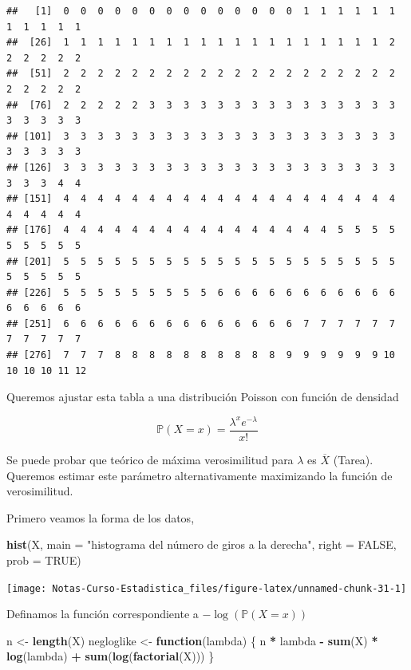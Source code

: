 \documentclass[
  12pt,
]{book}
\newenvironment{Shaded}{\begin{snugshade}}{\end{snugshade}}
\newcommand{\ControlFlowTok}[1]{\textcolor[rgb]{0.13,0.29,0.53}{\textbf{#1}}}
\newcommand{\DataTypeTok}[1]{\textcolor[rgb]{0.13,0.29,0.53}{#1}}
\newcommand{\KeywordTok}[1]{\textcolor[rgb]{0.13,0.29,0.53}{\textbf{#1}}}
\newcommand{\NormalTok}[1]{#1}
\newcommand{\OperatorTok}[1]{\textcolor[rgb]{0.81,0.36,0.00}{\textbf{#1}}}
\newcommand{\OtherTok}[1]{\textcolor[rgb]{0.56,0.35,0.01}{#1}}
\newcommand{\StringTok}[1]{\textcolor[rgb]{0.31,0.60,0.02}{#1}}
\begin{document}
\begin{verbatim}
##   [1]  0  0  0  0  0  0  0  0  0  0  0  0  0  0  1  1  1  1  1  1  1  1  1  1  1
##  [26]  1  1  1  1  1  1  1  1  1  1  1  1  1  1  1  1  1  1  1  2  2  2  2  2  2
##  [51]  2  2  2  2  2  2  2  2  2  2  2  2  2  2  2  2  2  2  2  2  2  2  2  2  2
##  [76]  2  2  2  2  2  3  3  3  3  3  3  3  3  3  3  3  3  3  3  3  3  3  3  3  3
## [101]  3  3  3  3  3  3  3  3  3  3  3  3  3  3  3  3  3  3  3  3  3  3  3  3  3
## [126]  3  3  3  3  3  3  3  3  3  3  3  3  3  3  3  3  3  3  3  3  3  3  3  4  4
## [151]  4  4  4  4  4  4  4  4  4  4  4  4  4  4  4  4  4  4  4  4  4  4  4  4  4
## [176]  4  4  4  4  4  4  4  4  4  4  4  4  4  4  4  4  5  5  5  5  5  5  5  5  5
## [201]  5  5  5  5  5  5  5  5  5  5  5  5  5  5  5  5  5  5  5  5  5  5  5  5  5
## [226]  5  5  5  5  5  5  5  5  5  6  6  6  6  6  6  6  6  6  6  6  6  6  6  6  6
## [251]  6  6  6  6  6  6  6  6  6  6  6  6  6  6  7  7  7  7  7  7  7  7  7  7  7
## [276]  7  7  7  8  8  8  8  8  8  8  8  8  8  9  9  9  9  9  9 10 10 10 10 11 12
\end{verbatim}

Queremos ajustar esta tabla a una distribución Poisson con función de densidad

\[
\mathbb{P}(X=x) = \frac{\lambda^x e^{-\lambda}}{x!} 
\]

Se puede probar que teórico de máxima verosimilitud para \(\lambda\) es \(\overline{X}\) (Tarea). Queremos estimar este parámetro alternativamente maximizando la función de verosimilitud.

Primero veamos la forma de los datos,

\begin{Shaded}
\begin{Highlighting}[]
\KeywordTok{hist}\NormalTok{(X, }\DataTypeTok{main =} \StringTok{"histograma del número de giros a la derecha"}\NormalTok{, }\DataTypeTok{right =} \OtherTok{FALSE}\NormalTok{, }\DataTypeTok{prob =} \OtherTok{TRUE}\NormalTok{)}
\end{Highlighting}
\end{Shaded}

\begin{center}\texttt{[image: Notas-Curso-Estadistica\_files/figure-latex/unnamed-chunk-31-1]} \end{center}

Definamos la función correspondiente a \(-\log(\mathbb{P}(X=x))\)

\begin{Shaded}
\begin{Highlighting}[]
\NormalTok{n \textless{}{-}}\StringTok{ }\KeywordTok{length}\NormalTok{(X)}
\NormalTok{negloglike \textless{}{-}}\StringTok{ }\ControlFlowTok{function}\NormalTok{(lambda) \{}
\NormalTok{  n }\OperatorTok{*}\StringTok{ }\NormalTok{lambda }\OperatorTok{{-}}\StringTok{ }\KeywordTok{sum}\NormalTok{(X) }\OperatorTok{*}\StringTok{ }\KeywordTok{log}\NormalTok{(lambda) }\OperatorTok{+}\StringTok{ }\KeywordTok{sum}\NormalTok{(}\KeywordTok{log}\NormalTok{(}\KeywordTok{factorial}\NormalTok{(X)))}
\NormalTok{\}}
\end{Highlighting}
\end{Shaded}
\end{document}
